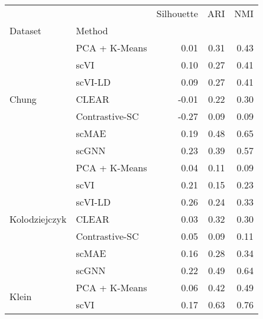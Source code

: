 \begin{tabular}{llrrr}
\toprule
 &  & Silhouette & ARI & NMI \\
Dataset &  Method &  &  &  \\
\midrule
\multirow[t]{7}{*}{Chung} &\cellcolor{red!10} PCA + K-Means &\cellcolor{red!10} 0.01 &\cellcolor{red!10} 0.31 &\cellcolor{red!10} 0.43 \\
 &\cellcolor{red!10} scVI &\cellcolor{red!10} 0.10 &\cellcolor{red!10} 0.27 &\cellcolor{red!10} 0.41 \\
 &\cellcolor{red!10} scVI-LD &\cellcolor{red!10} 0.09 &\cellcolor{red!10} 0.27 &\cellcolor{red!10} 0.41 \\
 &\cellcolor{blue!10} CLEAR &\cellcolor{blue!10} -0.01 &\cellcolor{blue!10} 0.22 &\cellcolor{blue!10} 0.30 \\
 &\cellcolor{blue!10} Contrastive-SC &\cellcolor{blue!10} -0.27 &\cellcolor{blue!10} 0.09 &\cellcolor{blue!10} 0.09 \\
 &\cellcolor{blue!10} scMAE &\cellcolor{blue!10} 0.19 &\cellcolor{blue!10} 0.48 &\cellcolor{blue!10} 0.65 \\
 &\cellcolor{green!10} scGNN &\cellcolor{green!10} 0.23 &\cellcolor{green!10} 0.39 &\cellcolor{green!10} 0.57 \\
\cline{1-5}
\multirow[t]{7}{*}{Kolodziejczyk} &\cellcolor{red!10} PCA + K-Means &\cellcolor{red!10} 0.04 &\cellcolor{red!10} 0.11 &\cellcolor{red!10} 0.09 \\
 &\cellcolor{red!10} scVI &\cellcolor{red!10} 0.21 &\cellcolor{red!10} 0.15 &\cellcolor{red!10} 0.23 \\
 &\cellcolor{red!10} scVI-LD &\cellcolor{red!10} 0.26 &\cellcolor{red!10} 0.24 &\cellcolor{red!10} 0.33 \\
 &\cellcolor{blue!10} CLEAR &\cellcolor{blue!10} 0.03 &\cellcolor{blue!10} 0.32 &\cellcolor{blue!10} 0.30 \\
 &\cellcolor{blue!10} Contrastive-SC &\cellcolor{blue!10} 0.05 &\cellcolor{blue!10} 0.09 &\cellcolor{blue!10} 0.11 \\
 &\cellcolor{blue!10} scMAE &\cellcolor{blue!10} 0.16 &\cellcolor{blue!10} 0.28 &\cellcolor{blue!10} 0.34 \\
 &\cellcolor{green!10} scGNN &\cellcolor{green!10} 0.22 &\cellcolor{green!10} 0.49 &\cellcolor{green!10} 0.64 \\
\cline{1-5}
\multirow[t]{7}{*}{Klein} &\cellcolor{red!10} PCA + K-Means &\cellcolor{red!10} 0.06 &\cellcolor{red!10} 0.42 &\cellcolor{red!10} 0.49 \\
 &\cellcolor{red!10} scVI &\cellcolor{red!10} 0.17 &\cellcolor{red!10} 0.63 &\cellcolor{red!10} 0.76 \\

\end{tabular}
